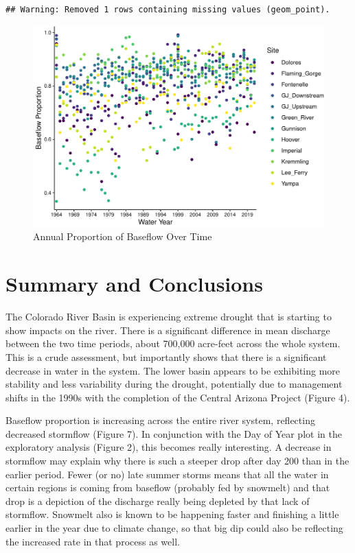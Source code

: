\documentclass[
  12pt,
]{article}
\begin{document}
\begin{verbatim}
## Warning: Removed 1 rows containing missing values (geom_point).
\end{verbatim}

\begin{figure}

\includegraphics{WDA_final_project_files/figure-latex/Proportion of Baseflow-1} \hfill{}

\caption{Annual Proportion of Baseflow Over Time}\label{fig:Proportion of Baseflow}
\end{figure}

\newpage

\hypertarget{summary-and-conclusions}{%
\section{Summary and Conclusions}\label{summary-and-conclusions}}

The Colorado River Basin is experiencing extreme drought that is
starting to show impacts on the river. There is a significant difference
in mean discharge between the two time periods, about 700,000 acre-feet
across the whole system. This is a crude assessment, but importantly
shows that there is a significant decrease in water in the system. The
lower basin appears to be exhibiting more stability and less variability
during the drought, potentially due to management shifts in the 1990s
with the completion of the Central Arizona Project (Figure 4).

Baseflow proportion is increasing across the entire river system,
reflecting decreased stormflow (Figure 7). In conjunction with the Day
of Year plot in the exploratory analysis (Figure 2), this becomes really
interesting. A decrease in stormflow may explain why there is such a
steeper drop after day 200 than in the earlier period. Fewer (or no)
late summer storms means that all the water in certain regions is coming
from baseflow (probably fed by snowmelt) and that drop is a depiction of
the discharge really being depleted by that lack of stormflow. Snowmelt
also is known to be happening faster and finishing a little earlier in
the year due to climate change, so that big dip could also be reflecting
the increased rate in that process as well.
\end{document}
